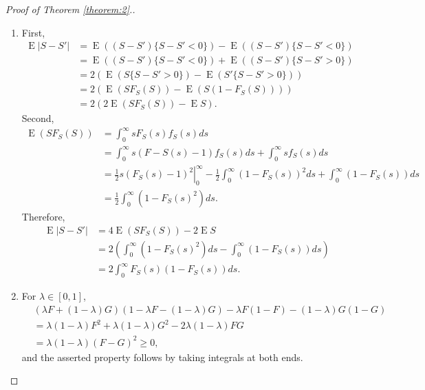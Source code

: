 \documentclass[12pt]{article}
\newcommand{\s}{S}
\DeclareMathOperator{\E}{E}
\begin{document}
  \begin{proof}[Proof of Theorem \ref{theorem:2}.]
    
    \begin{enumerate}
    \item
      First,
      \begin{align}
        \E|\s-\s'| &= \E((\s-\s')\{\s-\s'<0\}) - \E((\s-\s')\{\s-\s'<0\})\\
                   &= \E((\s-\s')\{\s-\s'<0\}) + \E((\s-\s')\{\s-\s'>0\})\\
                   &=2\left( \E(\s\{\s-\s'>0\}) - \E(\s'\{\s-\s'>0\}) \right)\\
                   &=2\left( \E(\s F_\s(\s)) - \E(\s(1-F_\s(\s))) \right)\\
                   &= 2\left(2\E(\s F_\s(\s)) - \E\s \right).
      \end{align}
      Second,
      \begin{align}
        \E(\s F_\s(\s)) &= \int_0^\infty s F_\s(s) f_\s(s) ds\\
                        &= \int_0^\infty s(F-\s(s)-1)f_\s(s)ds + \int_0^\infty s f_\s(s)ds\\
                        &=\left.\frac{1}{2}s(F_\s(s)-1)^2\right|_0^\infty - \frac{1}{2}\int_0^\infty(1-F_\s(s))^2ds + \int_0^\infty(1-F_\s(s))ds\\
        &=\frac{1}{2}\int_0^\infty(1-F_\s(s)^2)ds.
      \end{align}
      Therefore,
      \begin{align}
        \E|\s-\s'|&=4\E(\s F_\s(\s)) - 2\E\s\\
                  &=2\left(\int_0^\infty(1-F_\s(s)^2)ds - \int_0^\infty(1-F_\s(s))ds\right)\\
        &= 2\int_0^\infty F_\s(s)(1-F_\s(s))ds.
      \end{align}

    \item For $\lambda\in [0,1]$,
      \begin{align}
        &(\lambda F+(1-\lambda) G)(1-\lambda F-(1-\lambda)G) - \lambda F(1-F) - (1-\lambda)G(1-G)\\
        &= \lambda(1-\lambda) F^2 + \lambda(1-\lambda) G^2 - 2\lambda(1-\lambda)F G\\
        &=\lambda(1-\lambda)(F-G)^2 \ge 0,
      \end{align}
      and the asserted property follows by taking integrals at both ends.



\end{enumerate}
\end{proof}
\end{document}
